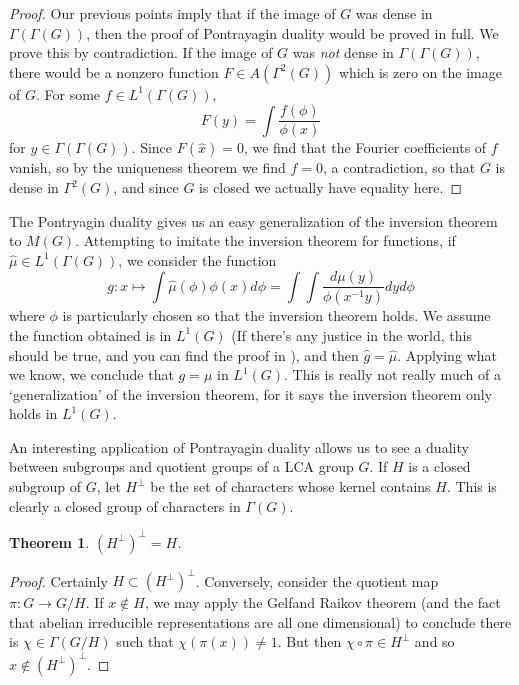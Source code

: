 \documentclass{article}
\theoremstyle{plain}
\newtheorem{theorem}{Theorem}
\theoremstyle{definition}
\begin{document}
\begin{proof}
Our previous points imply that if the image of $G$ was dense in $\Gamma(\Gamma(G))$, then the proof of Pontrayagin duality would be proved in full. We prove this by contradiction. If the image of $G$ was {\it not} dense in $\Gamma(\Gamma(G))$, there would be a nonzero function $F \in A(\Gamma^2(G))$ which is zero on the image of $G$. For some $f \in L^1(\Gamma(G))$,
%
\[ F(y) = \int \frac{f(\phi)}{\phi(x)} \]
%
for $y \in \Gamma(\Gamma(G))$. Since $F(\hat{x}) = 0$, we find that the Fourier coefficients of $f$ vanish, so by the uniqueness theorem we find $f = 0$, a contradiction, so that $G$ is dense in $\Gamma^2(G)$, and since $G$ is closed we actually have equality here.
\end{proof}

The Pontryagin duality gives us an easy generalization of the inversion theorem to $M(G)$. Attempting to imitate the inversion theorem for functions, if $\widehat{\mu} \in L^1(\Gamma(G))$, we consider the function
%
\[ g: x \mapsto \int \widehat{\mu}(\phi) \phi(x) d\phi = \int \int \frac{d\mu(y)}{\phi(x^{-1}y)} dy d\phi \]
%
where $\phi$ is particularly chosen so that the inversion theorem holds. We assume the function obtained is in $L^1(G)$ (If there's any justice in the world, this should be true, and you can find the proof in \cite{rudin}), and then $\hat{g} = \hat{\mu}$. Applying what we know, we conclude that $g = \mu$ in $L^1(G)$. This is really not really much of a `generalization' of the inversion theorem, for it says the inversion theorem only holds in $L^1(G)$.

An interesting application of Pontrayagin duality allows us to see a duality between subgroups and quotient groups of a LCA group $G$. If $H$ is a closed subgroup of $G$, let $H^\perp$ be the set of characters whose kernel contains $H$. This is clearly a closed group of characters in $\Gamma(G)$.

\begin{theorem}
    $(H^\perp)^\perp = H$.
\end{theorem}
\begin{proof}
    Certainly $H \subset (H^\perp)^\perp$. Conversely, consider the quotient map $\pi: G \to G/H$. If $x \not \in H$, we may apply the Gelfand Raikov theorem (and the fact that abelian irreducible representations are all one dimensional) to conclude there is $\chi \in \Gamma(G/H)$ such that $\chi(\pi(x)) \neq 1$. But then $\chi \circ \pi \in H^\perp$ and so $x \not \in (H^\perp)^\perp$.
\end{proof}
\end{document}
